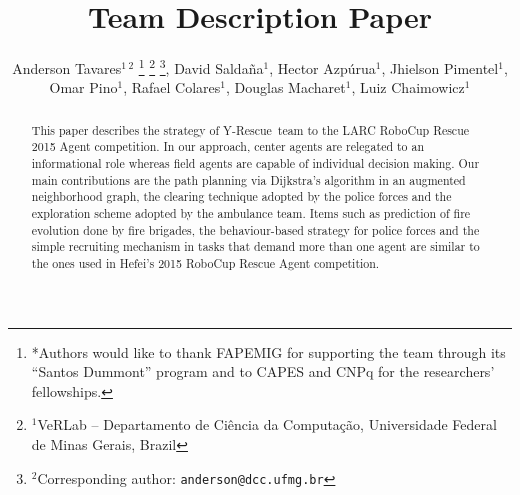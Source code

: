 \documentclass[a4paper, 10pt, conference]{ieeeconf}      %
\title{\teamname Team Description Paper}
\author{
	Anderson Tavares$^{1~2}$ 
		\thanks{*Authors would like to thank FAPEMIG for supporting the team through its ``Santos Dummont'' program and to CAPES and CNPq for the researchers' fellowships.}
		\thanks{$^{1}$VeRLab -- Departamento de Ciência da Computação, Universidade Federal de Minas Gerais, Brazil}
		\thanks{$^{2}$Corresponding author: {\tt\small anderson@dcc.ufmg.br}}, 
	David Saldaña$^{1}$, Hector Azpúrua$^{1}$, Jhielson Pimentel$^{1}$,\\ Omar Pino$^{1}$, Rafael Colares$^{1}$, 
  	Douglas Macharet$^{1}$, Luiz Chaimowicz$^{1}$ 
}
\newcommand{\teamname}{Y-Rescue~}
\begin{document}
\maketitle

\begin{abstract}
This paper describes the strategy of \teamname team to the LARC RoboCup Rescue 2015 Agent competition. %
In our approach, center agents are relegated to an informational role whereas field agents are capable of individual decision making. Our main contributions are the path planning via Dijkstra's algorithm in an augmented neighborhood graph, the clearing technique adopted by the police forces and the exploration scheme adopted by the ambulance team. Items such as prediction of fire evolution done by fire brigades, the behaviour-based strategy for police forces and the simple recruiting mechanism in tasks that demand more than one agent are similar to the ones used in Hefei's 2015 RoboCup Rescue Agent competition.
\end{abstract}




















%






%

\end{document}
